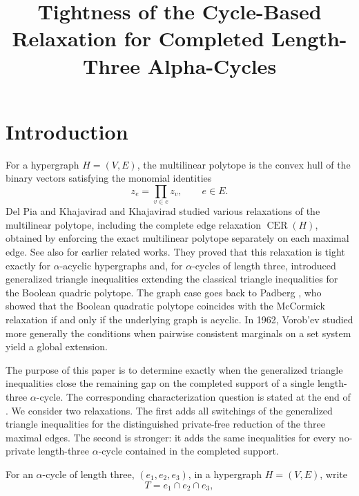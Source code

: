 \documentclass[11pt]{article}
\title[Cycle-based relaxations for alpha-cycles]
{Tightness of the Cycle-Based Relaxation for Completed Length-Three
Alpha-Cycles}
\theoremstyle{definition}
\theoremstyle{remark}
\newcommand{\CER}{\operatorname{CER}}
\begin{document}
\maketitle

\section{Introduction}

\begin{editedaiblock}

For a hypergraph $H=(V,E)$, the multilinear polytope is the convex hull of the binary vectors satisfying the monomial identities
\[
z_e=\prod_{v\in e}z_v,\qquad e\in E.
\]
Del Pia and Khajavirad \cite{delpia2017polyhedral,delpia2018acyclic,delpia2026cer} and Khajavirad \cite{khajavirad2023strength} studied various relaxations of the multilinear polytope, including the complete edge relaxation $\CER(H)$, obtained by enforcing the exact multilinear polytope separately on each maximal edge. See also \cite{boros2002pseudo, crama1993concave,padberg1989boolean,sherali1990hierarchy} for earlier related works.  They proved that this relaxation is tight exactly for $\alpha$-acyclic hypergraphs and, for $\alpha$-cycles of length three, introduced generalized triangle inequalities extending the classical triangle inequalities for the Boolean quadric polytope. The graph case goes back to Padberg \cite{padberg1989boolean}, who showed that the Boolean quadratic polytope coincides with the McCormick relaxation if and only if the underlying graph is acyclic.  In 1962, Vorob'ev \cite{vorobev1962consistent} studied more generally the conditions when pairwise consistent marginals on a set system yield a global extension.  

The purpose of this paper is to determine exactly when the generalized triangle inequalities close the remaining gap on the completed support of a single length-three $\alpha$-cycle. The corresponding characterization question is stated at the end of \cite[Section 5.2]{delpia2026cer}. We consider two relaxations. The first adds all switchings of the generalized triangle inequalities for the distinguished private-free reduction of the three maximal edges. The second is stronger: it adds the same inequalities for every no-private length-three $\alpha$-cycle contained in the completed support.

For an $\alpha$-cycle of length three, $(e_1,e_2,e_3)$, in a hypergraph $H=(V,E)$, write
\[
T=e_1\cap e_2\cap e_3,
\]


\end{editedaiblock}
\end{document}
